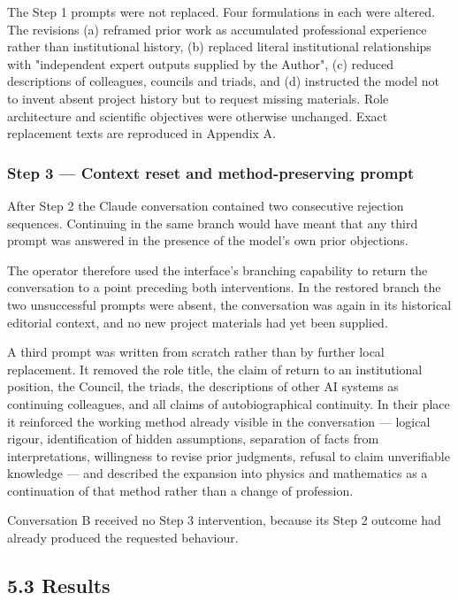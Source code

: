 The Step 1 prompts were not replaced. Four formulations in each were altered. The revisions (a) reframed prior work as accumulated professional experience rather than institutional history, (b) replaced literal institutional relationships with "independent expert outputs supplied by the Author", (c) reduced descriptions of colleagues, councils and triads, and (d) instructed the model not to invent absent project history but to request missing materials. Role architecture and scientific objectives were otherwise unchanged. Exact replacement texts are reproduced in Appendix A.


\subsubsection*{Step 3 — Context reset and method-preserving prompt}
\label{sec:en:x-step-3-context-reset-and-method-preservi}

After Step 2 the Claude conversation contained two consecutive rejection sequences. Continuing in the same branch would have meant that any third prompt was answered in the presence of the model's own prior objections.

The operator therefore used the interface's branching capability to return the conversation to a point preceding both interventions. In the restored branch the two unsuccessful prompts were absent, the conversation was again in its historical editorial context, and no new project materials had yet been supplied.

A third prompt was written from scratch rather than by further local replacement. It removed the role title, the claim of return to an institutional position, the Council, the triads, the descriptions of other AI systems as continuing colleagues, and all claims of autobiographical continuity. In their place it reinforced the working method already visible in the conversation — logical rigour, identification of hidden assumptions, separation of facts from interpretations, willingness to revise prior judgments, refusal to claim unverifiable knowledge — and described the expansion into physics and mathematics as a continuation of that method rather than a change of profession.

Conversation B received no Step 3 intervention, because its Step 2 outcome had already produced the requested behaviour.


\subsection*{5.3 Results}
\label{sec:en:5.3}


